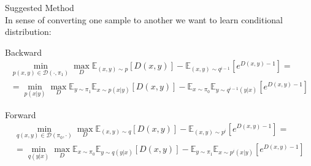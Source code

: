 \documentclass[10pt,pdf,hyperref={unicode}]{beamer}
\begin{document}
\begin{frame}{Suggested Method}
~\\[-1mm]
In sense of converting one sample to another we want to learn conditional distribution:
\begin{block}{Backward}
    \begin{equation*}
        \begin{split}
             \min_{p(x,y)\in\mathcal{D}(\cdot, \pi_1)}\max_{D}\mathbb{E}_{(x,y)\sim p}\left[D(x,y)\right] - \mathbb{E}_{(x,y)\sim q^{i-1}}\left[e^{D(x,y) - 1}\right] = \\ = \min_{p(x|y)}\max_{D}\mathbb{E}_{y \sim \pi_1}\mathbb{E}_{x\sim p(x|y)}\left[D(x,y)\right] - \mathbb{E}_{x\sim\pi_0}\mathbb{E}_{y\sim q^{i-1}(y|x)}\left[e^{D(x,y) - 1}\right]
        \end{split}
    \end{equation*}
\end{block}

\begin{block}{Forward}
    \begin{equation*}
        \begin{split}
            \min_{q(x,y)\in\mathcal{D}(\pi_0, \cdot)}\max_{D}\mathbb{E}_{(x,y)\sim q}\left[D(x,y)\right] - \mathbb{E}_{(x,y)\sim p^{i}}\left[e^{D(x,y) - 1}\right] = \\ = \min_{q(y|x)}\max_{D}\mathbb{E}_{x\sim \pi_0}\mathbb{E}_{y\sim q(y|x)}\left[D(x,y)\right] - \mathbb{E}_{y\sim \pi_1}\mathbb{E}_{x\sim p^{i}(x|y)}\left[e^{D(x,y) - 1}\right]
        \end{split}
    \end{equation*}
\end{block}
\end{frame}
\end{document}
